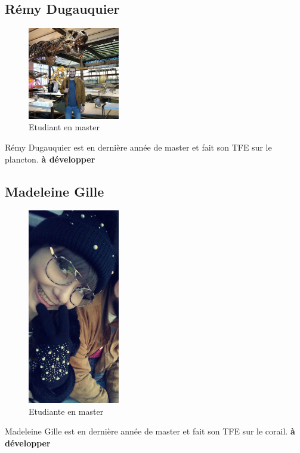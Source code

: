 \documentclass[]{article}
\begin{document}
\subsection{Rémy Dugauquier}\label{remy-dugauquier}

\begin{figure}[h!]
\includegraphics[width=4cm]{../image/remy.jpg}
\caption{Etudiant en master}
\end{figure}

Rémy Dugauquier est en dernière année de master et fait son TFE sur le
plancton. \textbf{à développer}

\subsection{Madeleine Gille}\label{madeleine-gille}

\begin{figure}[h!]
\includegraphics[width=4cm]{../image/madeleine.jpg}
\caption{Etudiante en master}
\end{figure}

Madeleine Gille est en dernière année de master et fait son TFE sur le
corail. \textbf{à développer}
\end{document}
